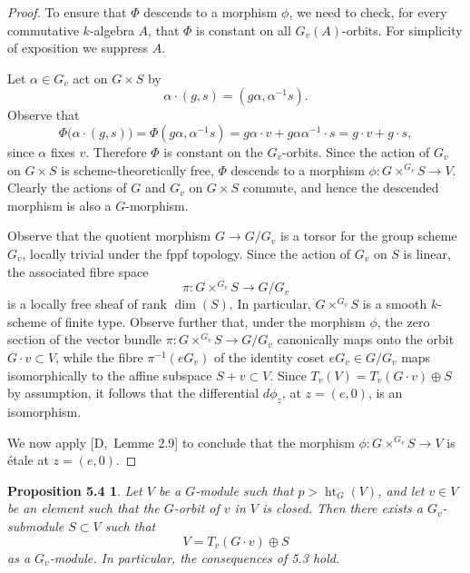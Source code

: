 \documentclass[11pt]{article}
\newcommand{\htG}{\operatorname{ht}_G}
\newtheorem*{proposition54}{Proposition 5.4}
\begin{document}
\begin{proof}
To ensure that \(\Phi\) descends to a morphism \(\phi\), we need to check, for every
commutative \(k\)-algebra \(A\), that \(\Phi\) is constant on all \(G_v(A)\)-orbits. For
simplicity of exposition we suppress \(A\).

Let \(\alpha\in G_v\) act on \(G\times S\) by
\[
  \alpha\cdot(g,s)=(g\alpha,\alpha^{-1}s).
\]
Observe that
\[
  \Phi\bigl(\alpha\cdot(g,s)\bigr)=\Phi(g\alpha,\alpha^{-1}s)
  =g\alpha\cdot v+g\alpha\alpha^{-1}\cdot s
  =g\cdot v+g\cdot s,
\]
since \(\alpha\) fixes \(v\). Therefore \(\Phi\) is constant on the \(G_v\)-orbits.
Since the action of \(G_v\) on \(G\times S\) is scheme-theoretically free, \(\Phi\)
descends to a morphism \(\phi:G\times^{G_v}S\to V\). Clearly the actions of \(G\) and
\(G_v\) on \(G\times S\) commute, and hence the descended morphism is also a
\(G\)-morphism.

Observe that the quotient morphism \(G\to G/G_v\) is a torsor for the group scheme
\(G_v\), locally trivial under the fppf topology. Since the action of \(G_v\) on \(S\)
is linear, the associated fibre space
\[
  \pi:G\times^{G_v}S\longrightarrow G/G_v
\]
is a locally free sheaf of rank \(\dim(S)\). In particular, \(G\times^{G_v}S\) is a
smooth \(k\)-scheme of finite type. Observe further that, under the morphism \(\phi\), the
zero section of the vector bundle \(\pi:G\times^{G_v}S\to G/G_v\) canonically maps onto
the orbit \(G\cdot v\subset V\), while the fibre \(\pi^{-1}(eG_v)\) of the identity coset
\(eG_v\in G/G_v\) maps isomorphically to the affine subspace \(S+v\subset V\). Since
\(T_v(V)=T_v(G\cdot v)\oplus S\) by assumption, it follows that the differential
\(d\phi_z\), at \(z=(e,0)\), is an isomorphism.

We now apply \([\mathrm D,\) Lemme 2.9] to conclude that the morphism
\(\phi:G\times^{G_v}S\to V\) is étale at \(z=(e,0)\).
\end{proof}

\begin{proposition54}
Let \(V\) be a \(G\)-module such that \(p>\htG(V)\), and let \(v\in V\) be an element
such that the \(G\)-orbit of \(v\) in \(V\) is closed. Then there exists a
\(G_v\)-submodule \(S\subset V\) such that
\[
  V=T_v(G\cdot v)\oplus S
\]
as a \(G_v\)-module. In particular, the consequences of 5.3 hold.
\end{proposition54}
\end{document}
